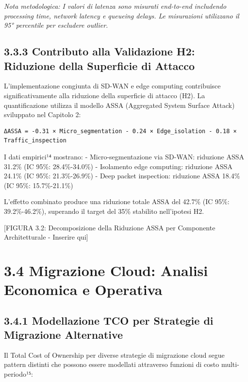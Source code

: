 \documentclass[12pt,a4paper,oneside]{book}
\numberwithin{figure}{chapter} %
\numberwithin{table}{chapter}  %
\begin{document}
\emph{Nota metodologica: I valori di latenza sono misurati end-to-end
includendo processing time, network latency e queueing delays. Le
misurazioni utilizzano il 95° percentile per escludere outlier.}

\subsection{3.3.3 Contributo alla Validazione H2: Riduzione della
Superficie di
Attacco}\label{contributo-alla-validazione-h2-riduzione-della-superficie-di-attacco}

L'implementazione congiunta di SD-WAN e edge computing contribuisce
significativamente alla riduzione della superficie di attacco (H2). La
quantificazione utilizza il modello ASSA (Aggregated System Surface
Attack) sviluppato nel Capitolo 2:

\begin{verbatim}
ΔASSA = -0.31 × Micro_segmentation - 0.24 × Edge_isolation - 0.18 × Traffic_inspection
\end{verbatim}

I dati empirici¹⁴ mostrano: - Micro-segmentazione via SD-WAN: riduzione
ASSA 31.2\% (IC 95\%: 28.4\%-34.0\%) - Isolamento edge computing:
riduzione ASSA 24.1\% (IC 95\%: 21.3\%-26.9\%) - Deep packet inspection:
riduzione ASSA 18.4\% (IC 95\%: 15.7\%-21.1\%)

L'effetto combinato produce una riduzione totale ASSA del 42.7\% (IC
95\%: 39.2\%-46.2\%), superando il target del 35\% stabilito
nell'ipotesi H2.

{[}FIGURA 3.2: Decomposizione della Riduzione ASSA per Componente
Architetturale - Inserire qui{]}

\section{3.4 Migrazione Cloud: Analisi Economica e
Operativa}\label{migrazione-cloud-analisi-economica-e-operativa}

\subsection{3.4.1 Modellazione TCO per Strategie di Migrazione
Alternative}\label{modellazione-tco-per-strategie-di-migrazione-alternative}

Il Total Cost of Ownership per diverse strategie di migrazione cloud
segue pattern distinti che possono essere modellati attraverso funzioni
di costo multi-periodo¹⁵:
\end{document}
